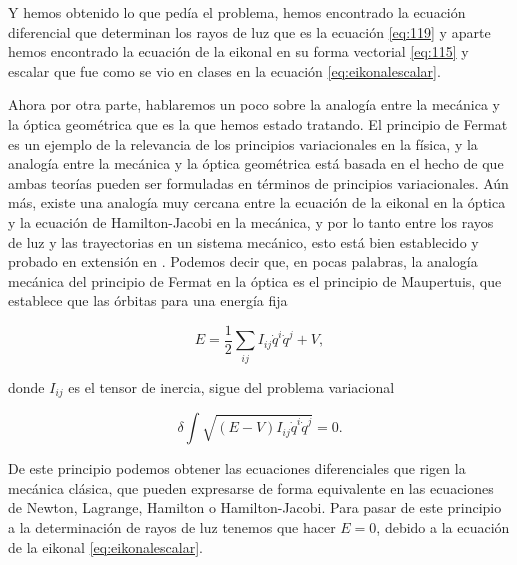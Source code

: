 \documentclass[a4paper,10pt]{article}
\numberwithin{equation}{section}
\begin{document}
Y hemos obtenido lo que pedía el problema, hemos encontrado la ecuación diferencial 
que determinan los rayos de luz que es la ecuación \eqref{eq:119} y aparte hemos encontrado 
la ecuación de la eikonal en su forma vectorial \eqref{eq:115} y escalar que fue 
como se vio en clases en la ecuación \eqref{eq:eikonalescalar}.

\vspace{.3cm}

Ahora por otra parte, hablaremos un poco sobre la analogía entre la mecánica y la 
óptica geométrica que es la que hemos estado tratando. El principio de Fermat es un 
ejemplo de la relevancia de los principios variacionales en la física, y la analogía 
entre la mecánica y la óptica geométrica está basada en el hecho de que ambas teorías 
pueden ser formuladas en términos de principios variacionales. Aún más, existe una 
analogía muy cercana entre la ecuación de la eikonal en la óptica y la ecuación de 
Hamilton-Jacobi en la mecánica, y por lo tanto entre los rayos de luz y las trayectorias 
en un sistema mecánico, esto está bien establecido y probado en extensión en 
\cite{romer}. Podemos decir que, en pocas palabras, la analogía mecánica del 
principio de Fermat en la óptica es el principio de Maupertuis, que establece que 
las órbitas para una energía fija

\begin{equation}
 E = \frac{1}{2}\sum_{ij} I_{ij} \dot{q}^i\dot{q}^j + V,
\end{equation}

donde $I_{ij}$ es el tensor de inercia, sigue del problema variacional 

\begin{equation}
 \delta \int \sqrt{(E-V)I_{ij} \dot{q}^i\dot{q}^j} = 0.
\end{equation}

De este principio podemos obtener las ecuaciones diferenciales que rigen la mecánica 
clásica, que pueden expresarse de forma equivalente en las ecuaciones de Newton, Lagrange, 
Hamilton o Hamilton-Jacobi. Para pasar de este principio a la determinación de 
rayos de luz tenemos que hacer $E=0$, debido a la ecuación de la eikonal \eqref{eq:eikonalescalar}.
\end{document}
